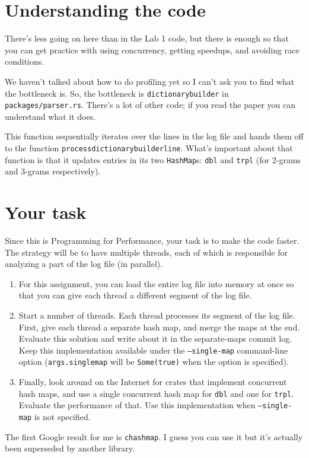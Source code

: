 \documentclass[12pt]{article}
\renewcommand{\_}{\kern-1.5pt\textunderscore\kern-1.5pt}
\begin{document}
\section*{Understanding the code}
There's less going on here than in the Lab 1 code, but there is enough so that you can get practice with using concurrency, getting speedups, and avoiding race conditions.

We haven't talked about how to do profiling yet so I can't ask you to find what the bottleneck is. So, the bottleneck is \texttt{dictionary\_builder} in \texttt{packages/parser.rs}. There's a lot of other code; if you read the paper you can understand what it does.

This function sequentially iterates over the lines in the log file and hands them off to the function \texttt{process\_dictionary\_builder\_line}. What's important about that function is that it updates entries in its two \texttt{HashMap}s: \texttt{dbl} and \texttt{trpl} (for 2-grams and 3-grams respectively).

\section*{Your task}
Since this is Programming for Performance, your task is to make the code faster. The strategy will be to have multiple threads, each of which is responsible for analyzing a part of the log file (in parallel).
\begin{enumerate}
\item For this assignment, you can load the entire log file into memory at once so that you can give each thread a different segment of the log file.
\item Start a number of threads. Each thread processes its segment of the log file. First, give each thread a separate hash map, and merge the maps at the end. Evaluate this solution and write about it in the separate-maps commit log. Keep this implementation available under the \texttt{--single-map} command-line option (\texttt{args.single\_map} will be \texttt{Some(true)} when the option is specified).
\item Finally, look around on the Internet for crates that implement concurrent hash maps, and use a single concurrent hash map for \texttt{dbl} and one for \texttt{trpl}. Evaluate the performance of that. Use this implementation when \texttt{--single-map} is not specified.
\end{enumerate}
The first Google result for me is \texttt{chashmap}. I guess you can use it but it's actually been superseded by another library.
\end{document}
